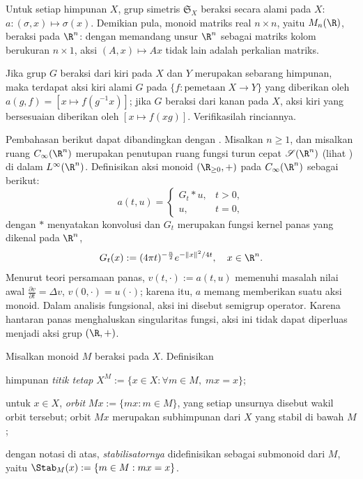 \begin{example}
	Untuk setiap himpunan $X$, grup simetris $\mathfrak{S}_X$ beraksi secara alami pada $X$: $a: (\sigma, x) \mapsto \sigma(x)$. Demikian pula, monoid matriks real $n \times n$, yaitu $M_n(\R)$, beraksi pada $\R^n$: dengan memandang unsur $\R^n$ sebagai matriks kolom berukuran $n \times 1$, aksi $(A, x) \mapsto A x$ tidak lain adalah perkalian matriks.
\end{example}

\begin{example}
	Jika grup $G$ beraksi dari kiri pada $X$ dan $Y$ merupakan sebarang himpunan, maka terdapat aksi kiri alami $G$ pada $\{f: \text{pemetaan}\; X \to Y \}$ yang diberikan oleh $a(g,f) = \left[ x \mapsto f(g^{-1}x) \right]$; jika $G$ beraksi dari kanan pada $X$, aksi kiri yang bersesuaian diberikan oleh $[x \mapsto f(xg)]$. Verifikasilah rinciannya.
\end{example}

\begin{example}
	Pembahasan berikut dapat dibandingkan dengan \cite[Contoh 7.2.4]{Zh2}. Misalkan $n \geq 1$, dan misalkan ruang $C_\infty(\R^n)$ merupakan penutupan ruang fungsi turun cepat $\mathscr{S}(\R^n)$ (lihat \cite[Contoh 3.2.7]{Zh1}) di dalam $L^\infty(\R^n)$. Definisikan aksi monoid $(\R_{\geq 0}, +)$ pada $C_\infty(\R^n)$ sebagai berikut:
	\[ a(t, u) =
		\begin{cases}
			G_t \ast u, & t > 0, \\
			u, & t=0,
		\end{cases}\]
	dengan $\ast$ menyatakan konvolusi dan $G_t$ merupakan fungsi kernel panas yang dikenal pada $\R^n$,
	\[ G_t(x) := (4\pi t)^{-\frac{n}{2}} e^{-\|x\|^2 /4t}, \quad x \in \R^n. \]
	Menurut teori persamaan panas, $v(t, \cdot) := a(t, u)$ memenuhi masalah nilai awal $\frac{\partial v}{\partial t} = \Delta v$, $v(0, \cdot) = u(\cdot)$; karena itu, $a$ memang memberikan suatu aksi monoid. Dalam analisis fungsional, aksi ini disebut semigrup operator. Karena hantaran panas menghaluskan singularitas fungsi, aksi ini tidak dapat diperluas menjadi aksi grup $(\R, +)$.
\end{example}

\begin{definition}
	Misalkan monoid $M$ beraksi pada $X$. Definisikan
	\begin{compactitem}
		\item himpunan \emph{titik tetap} $X^M := \{x \in X: \forall m \in M, \; mx=x \}$;
		\item untuk $x \in X$, \emph{orbit} $Mx := \{mx : m \in M \}$, yang setiap unsurnya disebut wakil orbit tersebut; orbit $Mx$ merupakan subhimpunan dari $X$ yang stabil di bawah $M$;
		\item dengan notasi di atas, \emph{stabilisatornya} didefinisikan sebagai submonoid dari $M$, yaitu $\Stab_M(x) := \{m \in M : mx=x\}$.
	\end{compactitem}
\end{definition}

